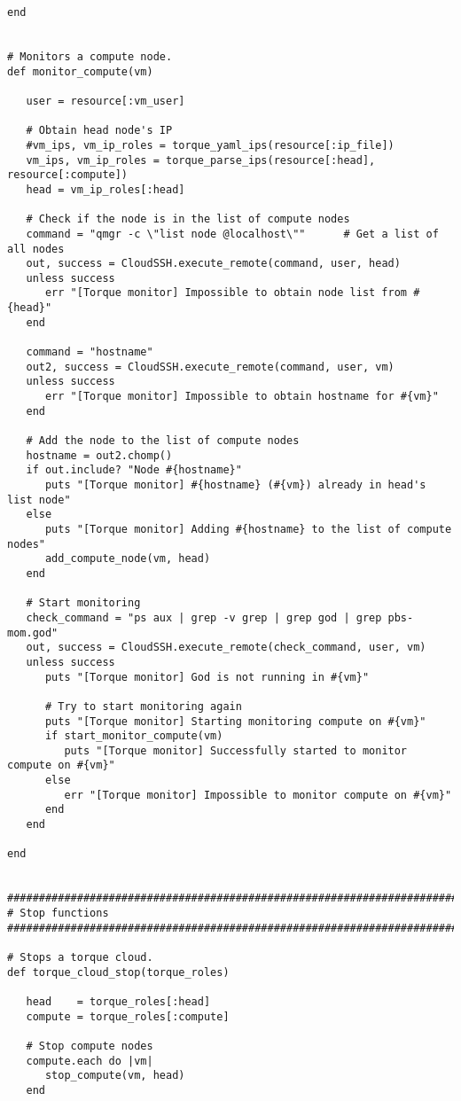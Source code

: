 \begin{lstlisting}
end


# Monitors a compute node.
def monitor_compute(vm)

   user = resource[:vm_user]

   # Obtain head node's IP
   #vm_ips, vm_ip_roles = torque_yaml_ips(resource[:ip_file])
   vm_ips, vm_ip_roles = torque_parse_ips(resource[:head], resource[:compute])
   head = vm_ip_roles[:head]

   # Check if the node is in the list of compute nodes
   command = "qmgr -c \"list node @localhost\""      # Get a list of all nodes
   out, success = CloudSSH.execute_remote(command, user, head)
   unless success
      err "[Torque monitor] Impossible to obtain node list from #{head}"
   end

   command = "hostname"
   out2, success = CloudSSH.execute_remote(command, user, vm)
   unless success
      err "[Torque monitor] Impossible to obtain hostname for #{vm}"
   end

   # Add the node to the list of compute nodes
   hostname = out2.chomp()
   if out.include? "Node #{hostname}"
      puts "[Torque monitor] #{hostname} (#{vm}) already in head's list node"
   else
      puts "[Torque monitor] Adding #{hostname} to the list of compute nodes"
      add_compute_node(vm, head)
   end

   # Start monitoring
   check_command = "ps aux | grep -v grep | grep god | grep pbs-mom.god"
   out, success = CloudSSH.execute_remote(check_command, user, vm)
   unless success
      puts "[Torque monitor] God is not running in #{vm}"
      
      # Try to start monitoring again
      puts "[Torque monitor] Starting monitoring compute on #{vm}"
      if start_monitor_compute(vm)
         puts "[Torque monitor] Successfully started to monitor compute on #{vm}"
      else
         err "[Torque monitor] Impossible to monitor compute on #{vm}"
      end
   end
   
end


################################################################################
# Stop functions
################################################################################

# Stops a torque cloud.
def torque_cloud_stop(torque_roles)

   head    = torque_roles[:head]
   compute = torque_roles[:compute]
   
   # Stop compute nodes
   compute.each do |vm|
      stop_compute(vm, head)
   end
   

\end{lstlisting}
